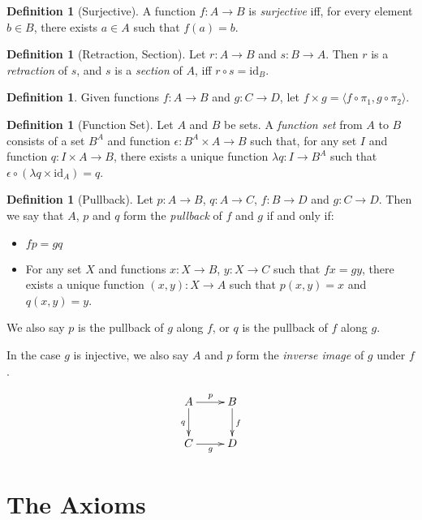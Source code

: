 \documentclass{book}
\theoremstyle{definition}
\newtheorem{df}[ax]{Definition}
\newcommand{\id}[1]{\ensuremath{\mathrm{id}_{#1}}}
\begin{document}
\begin{df}[Surjective]
A function $f : A \rightarrow B$ is \emph{surjective} iff, for every element $b \in B$, there exists $a \in A$ such that $f(a) = b$.
\end{df}

\begin{df}[Retraction, Section]
Let $r : A \rightarrow B$ and $s : B \rightarrow A$. Then $r$ is a \emph{retraction} of $s$, and $s$ is a \emph{section} of $A$, iff $r \circ s = \id{B}$.
\end{df}

\begin{df}
Given functions $f : A \rightarrow B$ and $g : C \rightarrow D$, let $f \times g = \langle f \circ \pi_1, g \circ \pi_2 \rangle$.
\end{df}

\begin{df}[Function Set]
Let $A$ and $B$ be sets. A \emph{function set} from $A$ to $B$ consists of a set $B^A$ and function $\epsilon : B^A \times A \rightarrow B$ such that, for any set $I$ and function $q : I \times A \rightarrow B$, there exists a unique function $\lambda q : I \rightarrow B^A$ such that $\epsilon \circ (\lambda q \times \id{A}) = q$.
\end{df}

\begin{df}[Pullback]
Let $p : A \rightarrow B$, $q : A \rightarrow C$, $f : B \rightarrow D$ and $g : C \rightarrow D$. Then we say that $A$, $p$ and $q$ form the \emph{pullback} of $f$ and $g$ if and only if:
\begin{itemize}
\item $fp = gq$
\item For any set $X$ and functions $x : X \rightarrow B$, $y : X \rightarrow C$ such that $fx = gy$, there exists a unique function $(x,y) : X \rightarrow A$ such that $p (x,y) = x$ and $q(x,y) = y$.
\end{itemize}
We also say $p$ is the pullback of $g$ along $f$, or $q$ is the pullback of $f$ along $g$.

In the case $g$ is injective, we also say $A$ and $p$ form the \emph{inverse image} of $g$ under $f$.
\end{df}

\[ \xymatrix{
A \ar[r]^p \ar[d]_q & B \ar[d]^f \\
C \ar[r]_g & D
} \]

\section{The Axioms}
\end{document}
